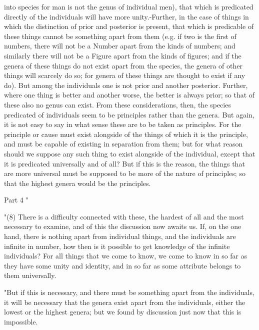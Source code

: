 into species for man is not the genus of individual men), that which
is predicated directly of the individuals will have more unity.-Further,
in the case of things in which the distinction of prior and posterior
is present, that which is predicable of these things cannot be something
apart from them (e.g. if two is the first of numbers, there will not
be a Number apart from the kinds of numbers; and similarly there will
not be a Figure apart from the kinds of figures; and if the genera
of these things do not exist apart from the species, the genera of
other things will scarcely do so; for genera of these things are thought
to exist if any do). But among the individuals one is not prior and
another posterior. Further, where one thing is better and another
worse, the better is always prior; so that of these also no genus
can exist. From these considerations, then, the species predicated
of individuals seem to be principles rather than the genera. But again,
it is not easy to say in what sense these are to be taken as principles.
For the principle or cause must exist alongside of the things of which
it is the principle, and must be capable of existing in separation
from them; but for what reason should we suppose any such thing to
exist alongside of the individual, except that it is predicated universally
and of all? But if this is the reason, the things that are more universal
must be supposed to be more of the nature of principles; so that the
highest genera would be the principles. 

Part 4 "

"(8) There is a difficulty connected with these, the hardest of all
and the most necessary to examine, and of this the discussion now
awaits us. If, on the one hand, there is nothing apart from individual
things, and the individuals are infinite in number, how then is it
possible to get knowledge of the infinite individuals? For all things
that we come to know, we come to know in so far as they have some
unity and identity, and in so far as some attribute belongs to them
universally. 

"But if this is necessary, and there must be something apart from
the individuals, it will be necessary that the genera exist apart
from the individuals, either the lowest or the highest genera; but
we found by discussion just now that this is impossible.

